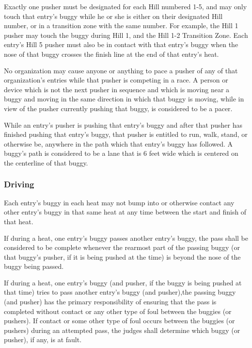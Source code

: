 	Exactly one pusher must be designated for each Hill numbered 1-5, and may only touch that entry's buggy while he or she is either on their designated Hill number, or in a transition zone with the same number. For example, the Hill 1 pusher may touch the buggy during Hill 1, and the Hill 1-2 Transition Zone. Each entry's Hill 5 pusher must also be in contact with that entry's buggy when the nose of that buggy crosses the finish line at the end of that entry's heat.

	No organization may cause anyone or anything to pace a pusher of any of that organization's entries while that pusher is competing in a race. A person or device which is not the next pusher in sequence and which is moving near a buggy and moving in the same direction in which that buggy is moving, while in view of the pusher currently pushing that buggy, is considered to be a pacer.

	While an entry's pusher is pushing that entry's buggy and after that pusher has finished pushing that entry's buggy, that pusher is entitled to run, walk, stand, or otherwise be, anywhere in the path which that entry's buggy has followed. A buggy's path is considered to be a lane that is 6 feet wide which is centered on the centerline of that buggy.

\subsubsection{Driving}

	Each entry's buggy in each heat may not bump into or otherwise contact any other entry's buggy in that same heat at any time between the start and finish of that heat.

	If during a heat, one entry's buggy passes another entry's buggy, the pass shall be considered to be complete whenever the rearmost part of the passing buggy (or that buggy's pusher, if it is being pushed at the time) is beyond the nose of the buggy being passed.

	If during a heat, one entry's buggy (and pusher, if the buggy is being pushed at that time) tries to pass another entry's buggy (and pusher),the passing buggy (and pusher) has the primary responsibility of ensuring that the pass is completed without contact or any other type of foul between the buggies (or pushers). If contact or some other type of foul occurs between the buggies (or pushers) during an attempted pass, the judges shall determine which buggy (or pusher), if any, is at fault.

